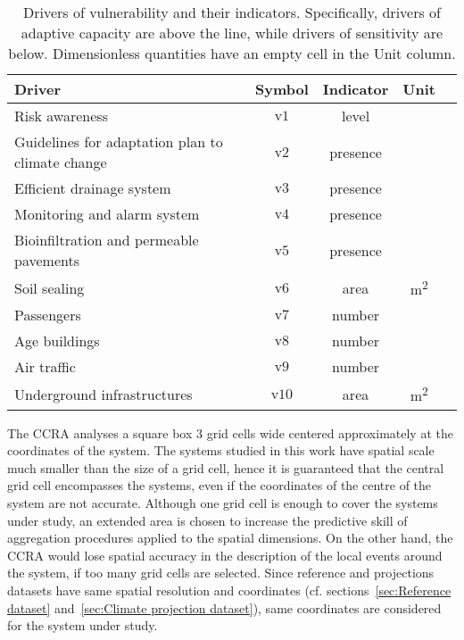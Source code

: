 \begin{table}
  \renewcommand*{\arraystretch}{1.5}
  \centering
  \caption{Drivers of vulnerability and their indicators. Specifically, drivers of adaptive capacity are above the line, while drivers of sensitivity are below. Dimensionless quantities have an empty cell in the Unit column.}
  \label{tab:drivers_vulnerability}
  \begin{tabular}{p{}cccc}
    Driver                                           & Symbol         & Indicator & Unit                 \\
    \hline
    Risk awareness                                   & $\mathrm{v1}$  & level     &                      \\
    Guidelines for adaptation plan to climate change & $\mathrm{v2}$  & presence  &                      \\
    Efficient drainage system                        & $\mathrm{v3}$  & presence  &                      \\
    Monitoring and alarm system                      & $\mathrm{v4}$  & presence  &                      \\
    Bioinfiltration and permeable pavements          & $\mathrm{v5}$  & presence  &                      \\
    \hline
    Soil sealing                                     & $\mathrm{v6}$  & area      & \unit{\square\metre} \\
    Passengers                                       & $\mathrm{v7}$  & number    &                      \\
    Age buildings                                    & $\mathrm{v8}$  & number    &                      \\
    Air traffic                                      & $\mathrm{v9}$  & number    &                      \\
    Underground infrastructures                      & $\mathrm{v10}$ & area      & \unit{\square\metre} \\
    \end{tabular}
\end{table}

The \gls{CCRA} analyses a square box 3 grid cells wide centered approximately at the coordinates of the system. The systems studied in this work have spatial scale much smaller than the size of a grid cell, hence it is guaranteed that the central grid cell encompasses the systems, even if the coordinates of the centre of the system are not accurate.
Although one grid cell is enough to cover the systems under study, an extended area is chosen to increase the predictive skill of aggregation procedures applied to the spatial dimensions. On the other hand, the \gls{CCRA} would lose spatial accuracy in the description of the local events around the system, if too many grid cells are selected.
Since reference and projections datasets have same spatial resolution and coordinates (cf. sections~\ref{sec:Reference dataset} and~\ref{sec:Climate projection dataset}), same coordinates are considered for the system under study.

